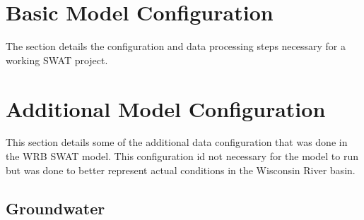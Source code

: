 	
\pagebreak
\section{Basic Model Configuration}\label{sec:basic_model_config}
	The section details the configuration and data processing steps necessary for a working SWAT project.
	
	
	
	
	
	
	
	
\pagebreak


%		
	
\pagebreak
\section{Additional Model Configuration}
	This section details some of the additional data configuration that was done in the WRB SWAT model. This configuration id not necessary for the model to run but was done to better represent actual conditions in the Wisconsin River basin.
	
	
	
	
	
	
\subsection{Groundwater}
	
	
	
	
\pagebreak